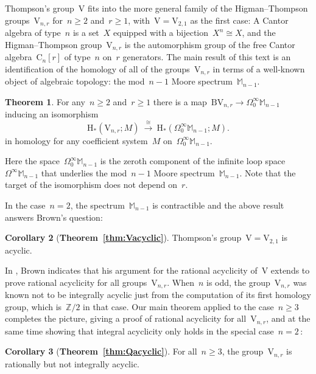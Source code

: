 \documentclass[10pt]{article}
\newcommand{\bbM}{\mathbb{M}}
\newcommand{\bbZ}{\mathbb{Z}}
\newcommand{\rmB}{\mathrm{B}}
\newcommand{\rmC}{\mathrm{C}}
\newcommand{\rmH}{\mathrm{H}}
\newcommand{\rmV}{\mathrm{V}}
\theoremstyle{definition}
\numberwithin{theorem}{section}
\numberwithin{equation}{section}
\numberwithin{figure}{section}
\newtheorem{Th}{Theorem}\renewcommand{\theTh}{\Alph{Th}}
\newtheorem{Co}[Th]{Corollary}%
\begin{document}
Thompson's group~$\rmV$ fits into the more general family of the Higman--Thompson groups~$\rmV_{n,r}$ for~\hbox{$n\geqslant 2$} and~$r\geqslant 1$, with~$\rmV=\rmV_{2,1}$ as the first case: %
A Cantor algebra of type~$n$ is a set~$X$ equipped with a bijection~\hbox{$X^n\cong X$}, and the Higman--Thompson group~$\rmV_{n,r}$ is the automorphism group of the free Cantor algebra~$\rmC_{n}[r]$ of type~$n$ on~$r$ generators. The main result of this text is an identification of the homology of all of the groups~$\rmV_{n,r}$ in terms of a well-known object of algebraic topology: the mod~\hbox{$n-1$} Moore spectrum~$\bbM_{n-1}$.  

\begin{Th}%
\label{thm:main}
For any~$n\geqslant2$ and~$r\geqslant1$ there is a map~$\rmB\rmV_{n,r} \to \Omega^\infty_0\bbM_{n-1}$ 
inducing an isomorphism 
\[
\rmH_*(\rmV_{n,r};M) \ \stackrel{\cong}\longrightarrow\ \rmH_*(\Omega^\infty_0\bbM_{n-1};M).
\] 
in homology for any coefficient system~$M$ on~$\Omega^\infty_0\bbM_{n-1}$. 
\end{Th}

Here the space~$\Omega^\infty_0\bbM_{n-1}$ is the zeroth component of the infinite loop space~$\Omega^\infty\bbM_{n-1}$ that underlies the mod~$n-1$ Moore spectrum~$\bbM_{n-1}$. 
Note that the target of the isomorphism does not depend on~$r$. 



In the case~$n=2$, the spectrum~$\bbM_{n-1}$ is contractible and the above result answers Brown's question: 

\begin{Co}[{\bf Theorem~\ref{thm:Vacyclic}}]
Thompson's group~$\rmV=\rmV_{2,1}$ is acyclic.
\end{Co}

In \cite{Brown:Suggestion}, Brown indicates that his argument for the rational acyclicity of~$\rmV$ extends to prove rational acyclicity for all groups~$\rmV_{n,r}$. 
When~$n$ is odd, the group~$\rmV_{n,r}$ was known not to be integrally acyclic just from the computation of its first homology group, which is~$\bbZ/2$ in that case. 
Our main theorem applied to the case~$n\geqslant 3$ completes the picture, giving 
a proof of rational acyclicity for all~$\rmV_{n,r}$, and at the same time showing that integral acyclicity only holds in the special case~$n=2$\,: 

\begin{Co}[{\bf Theorem~\ref{thm:Qacyclic}}]
For all~$n\geqslant 3$, the group~$\rmV_{n,r}$ is rationally but not integrally acyclic.   
\end{Co}
\end{document}

